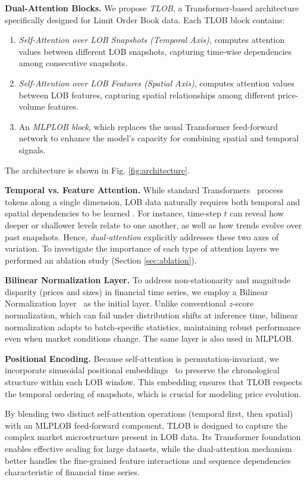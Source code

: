 \textbf{Dual-Attention Blocks.}
We propose \emph{TLOB}, a Transformer-based architecture specifically designed for Limit Order Book data. Each TLOB block contains:
\begin{enumerate}
    \item \emph{Self-Attention over LOB Snapshots (Temporal Axis)}, computes attention values between different LOB snapshots, capturing time-wise dependencies among consecutive snapshots.
    \item \emph{Self-Attention over LOB Features (Spatial Axis)}, computes attention values between LOB features, capturing spatial relationships among different price-volume features.
    \item An \emph{MLPLOB block}, which replaces the usual Transformer feed-forward network to enhance the model’s capacity for combining spatial and temporal signals.
\end{enumerate}
The architecture is shown in Fig. \ref{fig:architecture}.

\textbf{Temporal vs. Feature Attention.}
While standard Transformers~\cite{vaswani2017attention} process tokens along a single dimension, LOB data naturally requires both temporal and spatial dependencies to be learned \cite{sirignano2019deep, sirignano2021universal}. For instance, time-step $t$ can reveal how deeper or shallower levels relate to one another, as well as how trends evolve over past snapshots. Hence, \emph{dual-attention} explicitly addresses these two axes of variation. To investigate the importance of each type of attention layers we performed an ablation study (Section \ref{sec:ablation}).

\textbf{Bilinear Normalization Layer.}
To address non-stationarity and magnitude disparity (prices and sizes) in financial time series, we employ a Bilinear Normalization layer~\cite{tran2021data} as the initial layer. Unlike conventional $z$-score normalization, which can fail under distribution shifts at inference time, bilinear normalization adapts to batch-specific statistics, maintaining robust performance even when market conditions change. The same layer is also used in MLPLOB.

\textbf{Positional Encoding.}
Because self-attention is permutation-invariant, we incorporate sinusoidal positional embeddings~\cite{vaswani2017attention} to preserve the chronological structure within each LOB window. This embedding ensures that TLOB respects the temporal ordering of snapshots, which is crucial for modeling price evolution.

By blending two distinct self-attention operations (temporal first, then spatial) with an MLPLOB feed-forward component, TLOB is designed to capture the complex market microstructure present in LOB data. Its Transformer foundation enables effective scaling for large datasets, while the dual-attention mechanism better handles the fine-grained feature interactions and sequence dependencies characteristic of financial time series.
